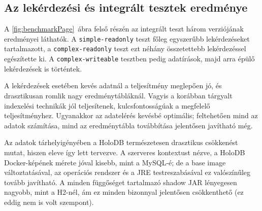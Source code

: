 \documentclass[
    parspace,
    noindent,
    nohyp,
]{elteiktdk}[2023/04/10]
\begin{document}
\subsection{Az lekérdezési és integrált tesztek eredménye}

A \ref{fig:benchmarkPage}~ábra felső részén
az integrált teszt három verziójának eredményei láthatók.
A \texttt{simple-readonly} teszt főleg egyszerűbb lekérdezéseket tartalmazott,
a \texttt{complex-readonly} teszt ezt néhány összetettebb lekérdezéssel egészítette ki.
A \texttt{complex-writeable} tesztben pedig adatírások,
majd arra épülő lekérdezések is történtek.

A lekérdezések esetében kevés adatnál a teljesítmény meglepően jó,
és drasztikusan romlik nagy eredménytábláknál.
Vagyis a korábban tárgyalt indexelési technikák jól teljesítenek,
kulcsfontosságúak a megfelelő teljesítményhez.
Ugyanakkor az adatelérés kevésbé optimális;
feltehetően mind az adatok számítása, mind az eredménytábla továbbítása jelentősen javítható még.

Az adatok tárhelyigényében a HoloDB természetesen drasztikus csökkenést mutat,
hiszen eleve így lett tervezve.
A szerveres kontextust nézve, a HoloDB Docker-képének mérete jóval kisebb, mint a MySQL-é;
de a base image változtatásával,
az operációs rendszer és a JRE testreszabásával ez valószínűleg tovább javítható.
A minden függőséget tartalmazó shadow JAR lényegesen nagyobb, mint a H2-nél,
ám ez minden bizonnyal jelentősen csökkenthető (ez eddig nem is volt szempont).

\cleardoublepage
\end{document}
